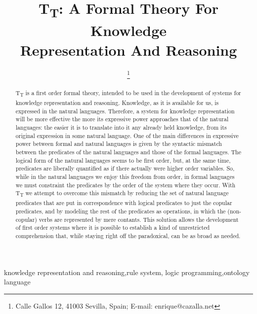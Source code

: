 \documentclass{IOS-Book-Article}     %
\def\hb{\hbox to 10.7 cm{}}
\begin{document}
\pagestyle{headings}
\def\thepage{}

\begin{frontmatter}          %
%
\title{T\textsubscript{T}: A Formal Theory For Knowledge\\
Representation And Reasoning}

\markboth{}{February 2016\hb}

\author{ 
\thanks{Calle Gallos 12, 41003 Sevilla, Spain; E-mail: enrique@cazalla.net}}
%
%
\begin{abstract}
T\textsubscript{T} is a first order formal theory, intended to be used in
the development of systems for knowledge representation and reasoning.
Knowledge, as it is available for us, is expressed in the natural languages.
Therefore, a system for knowledge representation will be more effective
the more its expressive power approaches that of the natural languages:
the easier it is to translate into it any already held knowledge, from its
original expression in some natural language.
One of the main differences in expressive power between formal and natural
languages is given by the
syntactic mismatch between the predicates of the natural
languages and those of the formal languages.
The logical form of the natural languages seems to be first order, but,
at the  same time, predicates are liberally quantified as if there
actually were higher order variables.
So, while in the natural languages we enjoy this freedom from order,
in formal languages we must constraint the predicates by the order of
the system where they occur.
With T\textsubscript{T} we attempt to overcome this
mismatch by reducing the set of natural language predicates that are
put in correspondence with logical predicates to just the copular predicates,
and by modeling the rest of the predicates as operations,
in which the (non-copular) verbs are represented by mere contants.
This solution allows the development of first order systems where
it is possible to establish a kind of unrestricted comprehension
that, while staying right off the paradoxical, can be as broad as needed.
\end{abstract}

\begin{keyword}
knowledge representation and reasoning\sep rule system\sep
logic programming\sep ontology language
\end{keyword}

\end{frontmatter}
\markboth{February 2016\hb}{February 2016\hb}
\end{document}
